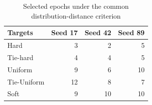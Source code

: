 \begin{table}[t]
\caption{Selected epochs under the common distribution-distance criterion}\label{tab:epochs}
\centering\begin{tabular}{lrrr}\toprule
Targets & Seed 17 & Seed 42 & Seed 89\\\midrule
Hard & 3 & 2 & 5\\
Tie-hard & 4 & 4 & 5\\
Uniform & 9 & 6 & 10\\
Tie-Uniform & 12 & 8 & 7\\
Soft & 9 & 10 & 10\\
\bottomrule\end{tabular}

\end{table}
